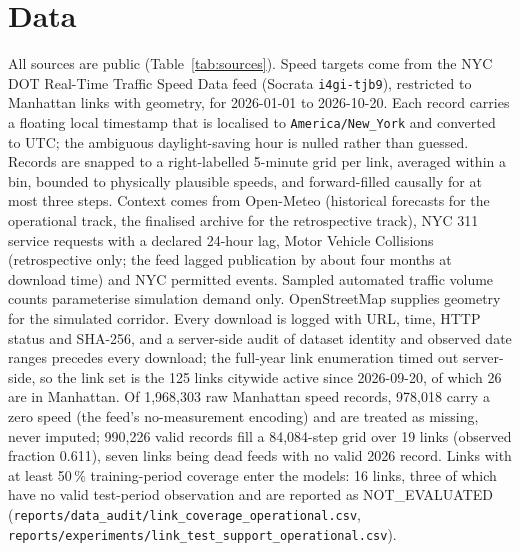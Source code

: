 \section{Data}
\label{sec:data}
All sources are public (Table~\ref{tab:sources}). Speed targets come from the NYC DOT Real-Time Traffic Speed Data
feed (Socrata \texttt{i4gi-tjb9}), restricted to Manhattan links with geometry, for 2026-01-01 to 2026-10-20. Each
record carries a floating local timestamp that is localised to \texttt{America/New\_York} and converted to UTC; the
ambiguous daylight-saving hour is nulled rather than guessed. Records are snapped to a right-labelled 5-minute grid
per link, averaged within a bin, bounded to physically plausible speeds, and forward-filled causally for at most
three steps. Context comes from Open-Meteo (historical forecasts for the operational track, the finalised archive
for the retrospective track), NYC 311 service requests with a declared 24-hour lag, Motor Vehicle Collisions
(retrospective only; the feed lagged publication by about four months at download time) and NYC permitted events.
Sampled automated traffic volume counts parameterise simulation demand only. OpenStreetMap supplies geometry for
the simulated corridor. Every download is logged with URL, time, HTTP status and SHA-256, and a server-side audit of
dataset identity and observed date ranges precedes every download; the full-year link enumeration timed out
server-side, so the link set is the 125 links citywide active since 2026-09-20, of which 26 are in Manhattan. Of
1{,}968{,}303 raw Manhattan speed records, 978{,}018 carry a zero speed (the feed's no-measurement encoding) and are
treated as missing, never imputed; 990{,}226 valid records fill a 84{,}084-step grid over 19 links (observed fraction
0.611), seven links being dead feeds with no valid 2026 record. Links with at least 50\,\% training-period coverage
enter the models: 16 links, three of which have no valid test-period observation and are reported as
NOT\_EVALUATED (\texttt{reports/data\_audit/link\_coverage\_operational.csv},
\texttt{reports/experiments/link\_test\_support\_operational.csv}).
